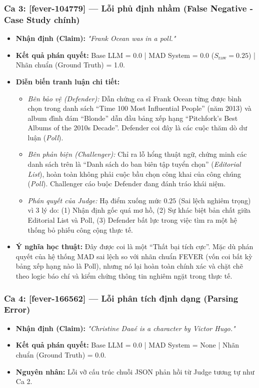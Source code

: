 \documentclass[12pt,a4paper]{report}
\begin{document}
\subsubsection{Ca 3: [fever-104779] — Lỗi phủ định nhầm (False Negative - Case Study chính)}
\begin{itemize}
    \item \textbf{Nhận định (Claim):} \textit{"Frank Ocean was in a poll."}
    \item \textbf{Kết quả phán quyết:} Base LLM = 0.0 | MAD System = 0.0 ($S_{\text{raw}} = 0.25$) | Nhãn chuẩn (Ground Truth) = 1.0.
    \item \textbf{Diễn biến tranh luận chi tiết:}
    \begin{itemize}
        \item \textit{Bên bảo vệ (Defender):} Dẫn chứng ca sĩ Frank Ocean từng được bình chọn trong danh sách ``Time 100 Most Influential People'' (năm 2013) và album đình đám ``Blonde'' dẫn đầu bảng xếp hạng ``Pitchfork's Best Albums of the 2010s Decade''. Defender coi đây là các cuộc thăm dò dư luận (\textit{Poll}).
        \item \textit{Bên phản biện (Challenger):} Chỉ ra lỗ hổng thuật ngữ, chứng minh các danh sách trên là ``Danh sách do ban biên tập tuyển chọn'' (\textit{Editorial List}), hoàn toàn không phải cuộc bầu chọn công khai của công chúng (\textit{Poll}). Challenger cáo buộc Defender đang đánh tráo khái niệm.
        \item \textit{Phán quyết của Judge:} Hạ điểm xuống mức $0.25$ (Sai lệch nghiêm trọng) vì 3 lý do: (1) Nhận định gốc quá mơ hồ, (2) Sự khác biệt bản chất giữa Editorial List và Poll, (3) Defender bất lực trong việc tìm ra một hệ thống bỏ phiếu công cộng thực tế.
    \end{itemize}
    \item \textbf{Ý nghĩa học thuật:} Đây được coi là một ``Thất bại tích cực''. Mặc dù phán quyết của hệ thống MAD sai lệch so với nhãn chuẩn FEVER (vốn coi bất kỳ bảng xếp hạng nào là Poll), nhưng nó lại hoàn toàn chính xác và chặt chẽ theo logic báo chí và kiểm chứng thông tin nghiêm ngặt trong thực tế.
\end{itemize}

\subsubsection{Ca 4: [fever-166562] — Lỗi phân tích định dạng (Parsing Error)}
\begin{itemize}
    \item \textbf{Nhận định (Claim):} \textit{"Christine Daaé is a character by Victor Hugo."}
    \item \textbf{Kết quả phán quyết:} Base LLM = 0.0 | MAD System = None | Nhãn chuẩn (Ground Truth) = 0.0.
    \item \textbf{Nguyên nhân:} Lỗi vỡ cấu trúc chuỗi JSON phản hồi từ Judge tương tự như Ca 2.
\end{itemize}
\end{document}
